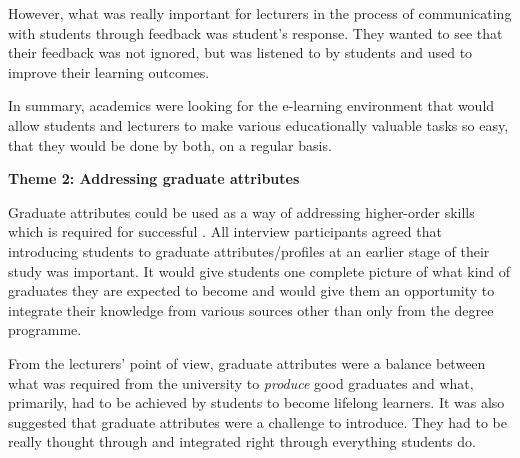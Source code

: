 However, what was really important for lecturers in the process of communicating
with students through feedback was student's response. They wanted to see that
their feedback was not ignored, but was listened to by students and used to
improve their learning outcomes.


In summary, academics were looking for the e-learning environment that would
allow students and lecturers to make various educationally valuable tasks so easy,
that they would be done by both, on a regular basis.

\textbf{Theme 2: Addressing graduate attributes}

Graduate attributes could be used as a way of addressing higher-order skills
which is required for successful \LLLs \citep{Hart1999}. All interview
participants agreed that introducing students to graduate attributes/profiles at
an earlier stage of their study was important. It would give students one
complete picture of what kind of graduates they are expected to become and would
give them an opportunity to integrate their knowledge from various sources other
than only from the degree programme.


From the lecturers' point of view, graduate attributes were a balance between
what was required from the university to \textit{produce} good graduates and
what, primarily, had to be achieved by students to become lifelong learners. It
was also suggested that graduate attributes were a challenge to introduce. They
had to be really thought through and integrated right through everything
students do.

